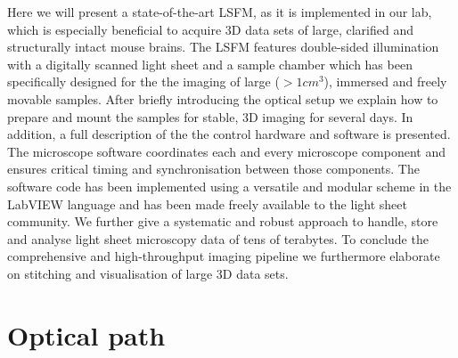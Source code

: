 \documentclass[12pt]{spieman}  %
\begin{document}
Here we will present a state-of-the-art LSFM, as it is implemented in our lab, which is especially beneficial to acquire 3D data sets of large, clarified and structurally intact mouse brains. The LSFM features double-sided illumination with a digitally scanned light sheet and a sample chamber which has been specifically designed for the the imaging of large ($> 1cm^3$), immersed and freely movable samples. After briefly introducing the optical setup we explain how to prepare and mount the samples for stable, 3D imaging for several days. In addition, a full description of the the control hardware and software is presented. The microscope software coordinates each and every microscope component and ensures critical timing and synchronisation between those components. The software code has been implemented using a versatile and modular scheme in the LabVIEW language and has been made freely available to the light sheet community. We further give a systematic and robust approach to handle, store and analyse light sheet microscopy data of tens of terabytes. To conclude the comprehensive and high-throughput imaging pipeline we furthermore elaborate on stitching and visualisation of large 3D data sets. 


\section{Optical path}
\end{document}
